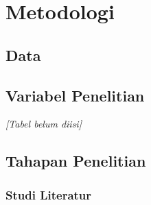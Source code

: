 \chapter{Metodologi}\label{ch:method}

    \section{Data}\label{sec:data source}

    \section{Variabel Penelitian}\label{sec:variables}

        \begin{table}[H]
            \centering
            \caption{Variabel penelitian}\label{tab:variables}
            \textit{[Tabel belum diisi]}
        \end{table}

    \section{Tahapan Penelitian}\label{sec:stages}

        \subsection{Studi Literatur}\label{subsec:literature study}
